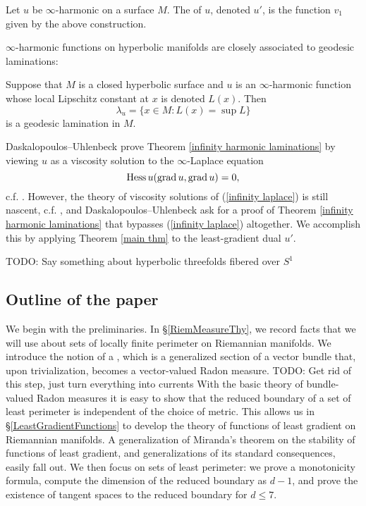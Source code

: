 \begin{definition}
Let $u$ be $\infty$-harmonic on a surface $M$. The  of $u$, denoted $u'$, is the function $v_1$ given by the above construction.
\end{definition}

$\infty$-harmonic functions on hyperbolic manifolds are closely associated to geodesic laminations:

\begin{theorem}\label{infinity harmonic laminations}
Suppose that $M$ is a closed hyperbolic surface and $u$ is an $\infty$-harmonic function whose local Lipschitz constant at $x$ is denoted $L(x)$. Then
$$\lambda_u = \{x \in M: L(x) = \sup L\}$$
is a geodesic lamination in $M$.
\end{theorem}

Daskalopoulos--Uhlenbeck prove Theorem \ref{infinity harmonic laminations} by viewing $u$ as a viscosity solution to the $\infty$-Laplace equation 
\begin{equation}\label{infinity laplace}
    \operatorname{Hess} u(\operatorname{grad} u, \operatorname{grad} u) = 0,
\end{equation}
c.f. \cite[\S5]{daskalopoulos2020transverse}.
However, the theory of viscosity solutions of (\ref{infinity laplace}) is still nascent, c.f. \cite{Aronsson1984} \cite{Evans08}, and Daskalopoulos--Uhlenbeck ask \cite[\S9]{daskalopoulos2020transverse} for a proof of Theorem \ref{infinity harmonic laminations} that bypasses (\ref{infinity laplace}) altogether.
We accomplish this by applying Theorem \ref{main thm} to the least-gradient dual $u'$.

TODO: Say something about hyperbolic threefolds fibered over $S^1$


\subsection{Outline of the paper}
We begin with the preliminaries.
In \S\ref{RiemMeasureThy}, we record facts that we will use about sets of locally finite perimeter on Riemannian manifolds.
We introduce the notion of a , which is a generalized section of a vector bundle that, upon trivialization, becomes a vector-valued Radon measure.
TODO: Get rid of this step, just turn everything into currents
With the basic theory of bundle-valued Radon measures it is easy to show that the reduced boundary of a set of least perimeter is independent of the choice of metric.
This allows us in \S\ref{LeastGradientFunctions} to develop the theory of functions of least gradient on Riemannian manifolds. A generalization of Miranda's theorem \cite[Teorema 3]{Miranda67} on the stability of functions of least gradient, and generalizations of its standard consequences, easily fall out.
We then focus on sets of least perimeter: we prove a monotonicity formula, compute the dimension of the reduced boundary as $d - 1$, and prove the existence of tangent spaces to the reduced boundary for $d \leq 7$.

